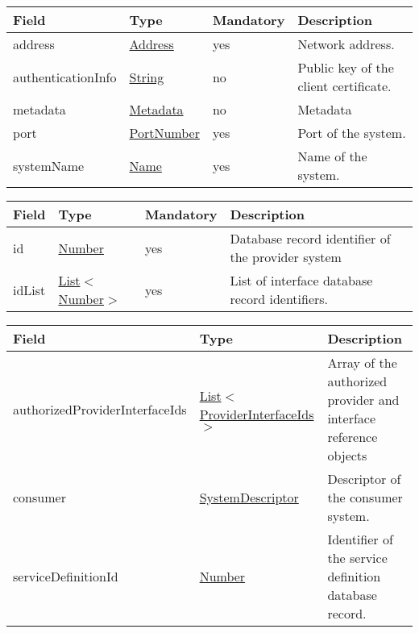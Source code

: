 \documentclass[a4paper]{arrowhead}
\newcommand{\pref}[1]{{\textcolor{ArrowheadGrey}{\hyperref[sec:model:primitives:#1]{#1}}}}
\begin{document}
\label{sec:model:SystemDescriptor}

\begin{table}[ht!]
\begin{tabularx}{\textwidth}{| p{3cm} | p{3cm} | p{2cm} | X |} \hline
\rowcolor{gray!33} Field & Type & Mandatory & Description \\ \hline
address & \pref{Address} & yes & Network address. \\ \hline
authenticationInfo & \pref{String} & no & Public key of the client certificate. \\ \hline
metadata & \hyperref[sec:model:Metadata]{Metadata} & no & Metadata \\ \hline
port & \pref{PortNumber} & yes & Port of the system. \\ \hline
systemName &\pref{Name} & yes & Name of the system. \\ \hline
\end{tabularx}
\end{table}

\label{sec:model:ProviderInterfaceIds}

\begin{table}[ht!]
\begin{tabularx}{\textwidth}{| p{3cm} | p{3cm} | p{2cm} | X |} \hline
\rowcolor{gray!33} Field & Type & Mandatory & Description \\ \hline
id & \pref{Number} & yes & Database record identifier of the provider system \\ \hline
idList & \pref{List}$<$\pref{Number}$>$ & yes & List of interface database record identifiers. \\ \hline
\end{tabularx}
\end{table}

\clearpage

\label{sec:model:CheckAuthRuleResponse}
 
\begin{table}[ht!]
\begin{tabularx}{\textwidth}{| p{5cm} | p{5cm} | X |} \hline
\rowcolor{gray!33} Field & Type & Description \\ \hline
authorizedProviderInterfaceIds & \pref{List}$<$\hyperref[sec:model:ProviderInterfaceIds]{ProviderInterfaceIds}$>$ & Array of the authorized provider and interface reference objects \\ \hline
consumer & \hyperref[sec:model:SystemDescriptor]{SystemDescriptor} &  Descriptor of the consumer system. \\ \hline
serviceDefinitionId &\pref{Number} & Identifier of the service definition database record. \\ \hline
\end{tabularx}
\end{table}
\end{document}
